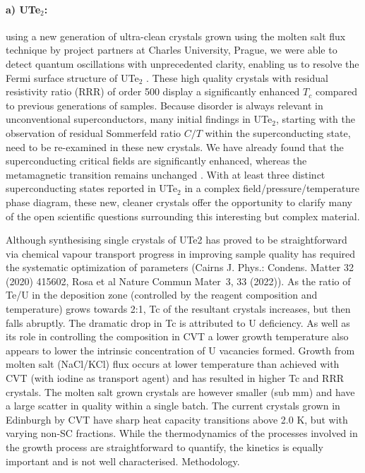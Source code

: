   \paragraph {a) UTe$_2$:} 
  using a new generation of ultra-clean crystals grown using the molten salt flux technique by project partners at Charles University, Prague, we were able to detect quantum oscillations with unprecedented clarity, enabling us to resolve the Fermi surface structure of UTe$_2$ \cite{eaton23}. These high quality crystals with residual resistivity ratio (RRR) of order 500 display a significantly enhanced $T_c$ compared to previous generations of samples. Because disorder is always relevant in unconventional superconductors, many initial findings in UTe$_2$, starting with the observation of residual Sommerfeld ratio $C/T$ within the superconducting state, need to be re-examined in these new crystals. We have already found that the superconducting critical fields are significantly enhanced, whereas the metamagnetic transition remains unchanged \cite{wu23}. With at least three distinct superconducting states reported in UTe$_2$ in a complex field/pressure/temperature phase diagram, these new, cleaner crystals offer the opportunity to clarify many of the open scientific questions surrounding this interesting but complex material.


Although synthesising single crystals of UTe2 has proved to be straightforward via chemical vapour transport progress in improving sample quality has required the systematic optimization of parameters (Cairns J. Phys.: Condens. Matter 32 (2020) 415602, Rosa et al Nature Commun Mater 3, 33 (2022)). As the ratio of Te/U in the deposition zone (controlled by the reagent composition and temperature) grows towards 2:1, Tc of the resultant crystals increases, but then falls abruptly. The dramatic drop in Tc is attributed to U deficiency. As well as its role in controlling the composition in CVT a lower growth temperature also appears to lower the intrinsic concentration of U vacancies formed. Growth from molten salt (NaCl/KCl) flux occurs at lower temperature than achieved with CVT (with iodine as transport agent) and has resulted in higher Tc and RRR crystals. The molten salt grown crystals are however smaller (sub mm) and have a large scatter in quality within a single batch. The current crystals grown in Edinburgh by CVT have sharp heat capacity transitions above 2.0 K, but with varying non-SC fractions. While the thermodynamics of the processes involved in the growth process are straightforward to quantify, the kinetics is equally important and is not well characterised.
Methodology.

